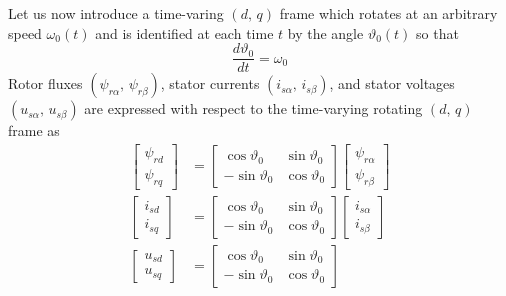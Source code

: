 \documentclass[12pt,a4paper,oneside]{book}
\begin{document}
\begin{onehalfspace}
Let us now introduce a time-varing $\left(d,\,q\right)$ frame which rotates at 
an arbitrary speed $\omega_0(t)$ and is identified at each time $t$ by the 
angle $\vartheta_0(t)$ so that
\begin{equation}\label{im_eq_39}
	\frac{d\vartheta_0}{dt} = \omega_0
\end{equation}
Rotor fluxes $(\psi_{r\alpha},\,\psi_{r\beta})$, stator currents 
$(i_{s\alpha},\,i_{s\beta})$, and stator voltages $(u_{s\alpha},\,u_{s\beta})$ 
are expressed with respect to the time-varying rotating $(d,\,q)$ frame as 
\begin{equation}\label{im_eq_40}
	\begin{aligned}
		\left[
		\begin{matrix}
			\psi_{rd} \\[6pt]
			\psi_{rq}
		\end{matrix}
		\right] & =
		\left[
		\begin{matrix}
			\cos\vartheta_0 & \sin\vartheta_0 \\[6pt]
			-\sin\vartheta_0 & \cos\vartheta_0 
		\end{matrix}
		\right]
		\left[
		\begin{matrix}
			\psi_{r\alpha} \\[6pt]
			\psi_{r\beta}
		\end{matrix}
		\right] \\[6pt]
		\left[
		\begin{matrix}
			i_{sd} \\[6pt]
			i_{sq}
		\end{matrix}
		\right] & =
		\left[
		\begin{matrix}
			\cos\vartheta_0 & \sin\vartheta_0 \\[6pt]
			-\sin\vartheta_0 & \cos\vartheta_0 
		\end{matrix}
		\right]
		\left[
		\begin{matrix}
			i_{s\alpha} \\[6pt]
			i_{s\beta}
		\end{matrix}
		\right] \\[6pt]
		\left[
		\begin{matrix}
			u_{sd} \\[6pt]
			u_{sq}
		\end{matrix} 
		\right] & = 
		\left[
		\begin{matrix}
			\cos\vartheta_0 & \sin\vartheta_0 \\[6pt]
			-\sin\vartheta_0 & \cos\vartheta_0
		\end{matrix}
		\right]

\end{aligned}
\end{equation}
\end{onehalfspace}
\end{document}
